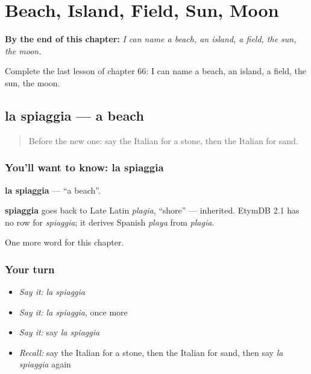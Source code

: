 
\chapter{Beach, Island, Field, Sun, Moon}
\label{ch:it-beach-island-field-sun-moon}

\begin{chapteropening}
\textbf{By the end of this chapter:} \emph{I can name a beach, an island, a field, the sun, the moon.}

Complete the last lesson of chapter 66: I can name a beach, an island, a field, the sun, the moon.
\end{chapteropening}

\section[la spiaggia]{la spiaggia — a beach}

\label{lesson:IT-C66-spiaggia}



\begin{quote}
Before the new one: say the Italian for a stone, then the Italian for sand.
\end{quote}

\subsection*{You'll want to know: la spiaggia}
\textbf{la spiaggia} — \textquotedblleft{}a beach\textquotedblright{}.

\begin{cousinweb}
\textbf{spiaggia} goes back to Late Latin \emph{plagia}, \textquotedblleft{}shore\textquotedblright{} — inherited. EtymDB 2.1 has no row for \emph{spiaggia}; it derives Spanish \emph{playa} from \emph{plagia}.
\end{cousinweb}

\begin{grammarlens}[title={What you've built}]
One more word for this chapter.
\end{grammarlens}

\subsection*{Your turn}
\begin{itemize}
\raggedright
  \item \emph{Say it:} \emph{la spiaggia}
  \item \emph{Say it:} \emph{la spiaggia}, once more
  \item \emph{Say it:} say \emph{la spiaggia}
  \item \emph{Recall:} say the Italian for a stone, then the Italian for sand, then say \emph{la spiaggia} again
\end{itemize}

